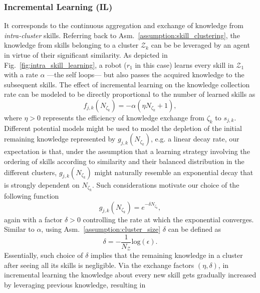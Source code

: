 \subsubsection{\textbf{Incremental Learning (IL)}}
It corresponds to the continuous aggregation and exchange of knowledge from \emph{intra-cluster} skills. Referring back to Asm.~\ref{assumption:skill_clustering}, the knowledge from skills belonging to a cluster ${\mathcal{Z}_k}$ can be be leveraged by an agent in virtue of their significant similarity. As depicted in Fig.~\ref{fig:intra_skill_learning}, a robot ($r_1$ in this case) learns every skill in $\mathcal{Z}_1$ with a rate $\alpha$ ---the self loops--- but also passes the acquired knowledge to the subsequent skills. The effect of incremental learning on the knowledge collection rate can be modeled to be directly proportional to the number of learned skills as
\begin{equation}\label{eq:f_function_incremental}
	f_{j,k}\left(N_{\zeta_k}\right) = -\alpha\left(\eta N_{\zeta_k} + 1 \right), 
\end{equation}
where $\eta>0$ represents the efficiency of knowledge exchange from $\zeta_k$ to $s_{j,k}$. Different potential models might be used to model the depletion of the initial remaining knowledge represented by $g_{j,k}\left(N_{\zeta_k}\right)$, e.g. a linear decay rate, our expectation is that, under the assumption that a learning strategy involving the ordering of skills according to similarity and their balanced distribution in the different clusters, $g_{j,k}\left(N_{\zeta_k}\right)$ might naturally resemble an exponential decay that is strongly dependent on $N_{\zeta_k}$. Such considerations motivate our choice of the following function
\begin{equation}\label{eq:g_function_incremental}
	g_{j,k}\left(N_{\zeta_k}\right) = e^{-\delta N_{\zeta_k}},
\end{equation}
again with a factor $\delta>0$ controlling the rate at which the exponential converges. Similar to $\alpha$, using Asm.~\ref{assumption:cluster_size} $\delta$ can be defined as 
\begin{equation}\label{eq:delta}
	\delta = -\frac{1}{N_\mathcal{Z}}\text{log}(\epsilon).
\end{equation}
Essentially, such choice of $\delta$ implies that the remaining knowledge in a cluster after seeing all its skills is negligible. Via the exchange factors $(\eta,\delta)$, in incremental learning the knowledge about every new skill gets gradually increased by leveraging previous knowledge, resulting in
